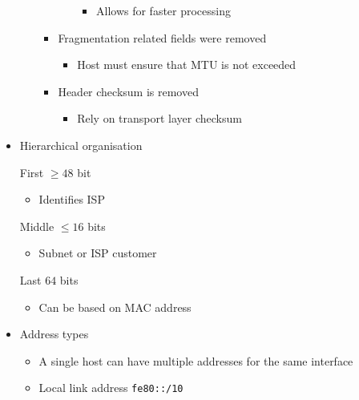 \begin{itemize}
\begin{itemize}
\begin{itemize}
\begin{itemize}
\begin{itemize}
                                    \item Allows for faster processing
                                \end{itemize}
                        \end{itemize}
                    \item Fragmentation related fields were removed
                        \begin{itemize}
                            \item Host must ensure that MTU is not exceeded
                        \end{itemize}
                    \item Header checksum is removed
                        \begin{itemize}
                            \item Rely on transport layer checksum
                        \end{itemize}
                \end{itemize}
        \end{itemize}
    \item Hierarchical organisation
        \begin{itemize}
             First $\ge 48$ bit
                \begin{itemize}
                    \item Identifies ISP
                \end{itemize}
             Middle $\le 16$ bits
                \begin{itemize}
                    \item Subnet or ISP customer
                \end{itemize}
             Last $64$ bits
                \begin{itemize}
                    \item Can be based on MAC address
                \end{itemize}
        \end{itemize}
    \item Address types
        \begin{itemize}
            \item A single host can have multiple addresses for the same interface 
            \item Local link address \verb+fe80::/10+
                \begin{itemize}

\end{itemize}
\end{itemize}
\end{itemize}
